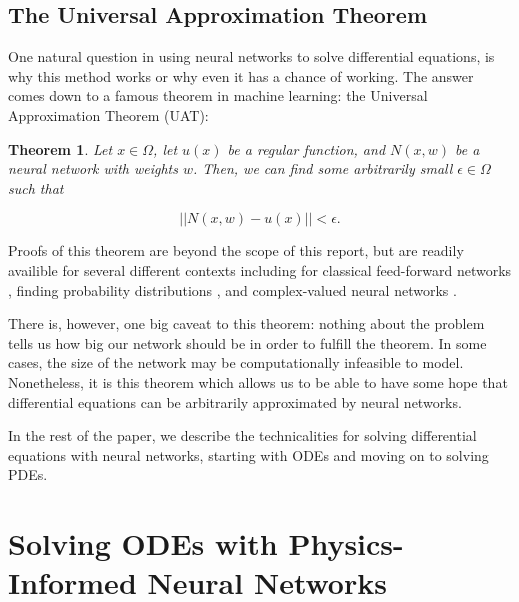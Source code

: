 \documentclass{CUP-JNL-DTM}%
\newtheorem{theorem}{Theorem}[section]
\theoremstyle{definition}
\numberwithin{equation}{section}
\begin{document}

\subsection{The Universal Approximation Theorem}

One natural question in using neural networks to solve differential equations, is why this method works or why even it has a chance of working. The answer comes down to a famous theorem in machine learning: the Universal Approximation Theorem (UAT):

\begin{theorem}

Let $x \in \Omega$, let $u(x)$ be a regular function, and $N(x,w)$ be a neural network with weights $w$. Then, we can find some arbitrarily small $\epsilon \in \Omega$ such that 

\begin{equation}
	||N(x,w) - u(x)|| < \epsilon. 
\end{equation}

\end{theorem}

\noindent Proofs of this theorem are beyond the scope of this report, but are readily availible for several different contexts including for classical feed-forward networks \cite{hornikMultilayerFeedforwardNetworks1989, hornikApproximationCapabilitiesMultilayer1991}, finding probability distributions \cite{luUniversalApproximationTheorem2020}, and complex-valued neural networks \cite{voigtlaenderUniversalApproximationTheorem2020}. 

There is, however, one big caveat to this theorem: nothing about the problem tells us how big our network should be in order to fulfill the theorem. In some cases, the size of the network may be computationally infeasible to model. Nonetheless, it is this theorem which allows us to be able to have some hope that differential equations can be arbitrarily approximated by neural networks. 

In the rest of the paper, we describe the technicalities for solving differential equations with neural networks, starting with ODEs and moving on to solving PDEs. 


\section{Solving ODEs with Physics-Informed Neural Networks}
\end{document}
